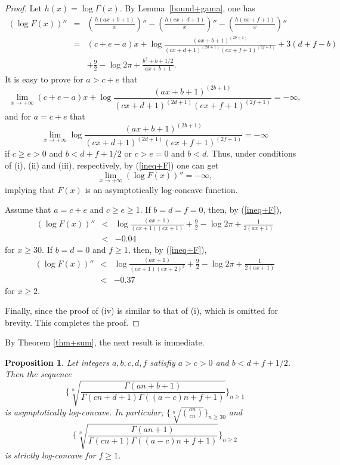 \documentclass[12pt,reqno]{article}
\newtheorem{prop}[thm]{Proposition}
\theoremstyle{definition}
\numberwithin{equation}{section}
\begin{document}
\begin{proof}
Let $h(x)=\log{\Gamma(x)}$. By Lemma~\ref{bound+gama}, one has
\begin{eqnarray}\label{ineq+F}
\left(\log
F(x)\right)''&=&\left(\frac{h(ax+b+1)}{x}\right)''-\left(\frac{h(cx+d+1)}{x}\right)''-\left(\frac{h(e x+f+1)}{x}\right)''\nonumber\\
&=&(c+e-a)x+\log\frac{(ax+b+1)^{(2b+1)}}{(cx+d+1)^{(2d+1)}(ex+f+1)^{(2f+1)}}+3(d+f-b)\nonumber\\
&&+\frac{9}{2}-\log 2\pi+\frac{b^2+b+1/2}{ax+b+1}.
\end{eqnarray}
It is easy to prove for $a> c+e$ that
$$\lim_{x\rightarrow+\infty}(c+e-a)x+\log\frac{(ax+b+1)^{(2b+1)}}{(cx+d+1)^{(2d+1)}(ex+f+1)^{(2f+1)}}=-\infty,$$
and for $a= c+e$ that
$$\lim_{x\rightarrow+\infty}\log\frac{(ax+b+1)^{(2b+1)}}{(cx+d+1)^{(2d+1)}(ex+f+1)^{(2f+1)}}=-\infty$$
if $c\ge e>0$ and $b< d+f+1/2$ or $c> e=0$ and $b< d$.
 Thus, under conditions of (i), (ii) and (iii), respectively, by (\ref{ineq+F}) one can get $$\lim_{x\rightarrow+\infty}\left(\log
F(x)\right)''=-\infty,$$ implying that $F(x)$ is an asymptotically
log-concave function.

Assume that $a=c+e$ and $c\ge e\ge 1$. If $b=d=f=0$, then, by
(\ref{ineq+F}),
\begin{eqnarray*} \left(\log F(x)\right)''
&<&\log\frac{(ax+1)}{(cx+1)(ex+1)}+\frac{9}{2}-\log 2\pi+\frac{1}{2(ax+1)}\\
&<&-0.04
\end{eqnarray*}
for $x\geq 30$.
 If $b=d=0$ and $f\geq1$, then, by
(\ref{ineq+F}),
\begin{eqnarray*} \left(\log F(x)\right)''
&<&\log\frac{(ax+1)}{(cx+1)(ex+2)^3}+\frac{9}{2}-\log 2\pi+\frac{1}{2(ax+1)}\\
&<&-0.37
\end{eqnarray*}
for $x\geq 2$.

Finally, since the proof of (iv) is similar to that of (i), which is
omitted for brevity. This completes the proof.
\end{proof}
By Theorem \ref{thm+sum}, the next result is immediate.
\begin{prop}\label{cor+bino}
Let integers $a,b,c,d,f$ satisfiy $a> c>0$ and $b< d+f+1/2$. Then
the sequence $$\{\sqrt[n]{\frac{\Gamma(an+b+1)}{\Gamma(c
n+d+1)\Gamma((a-c) n+f+1)}}\}_{n\geq1}$$ is asymptotically
log-concave. In particular, $\{\sqrt[n]{\binom{an}{cn}}\}_{n\geq30}$
and $$\{\sqrt[n]{\frac{\Gamma(an+1)}{\Gamma(c n+1)\Gamma((a-c)
n+f+1)}}\}_{n\geq2}$$ is strictly log-concave for $f\geq 1$.
\end{prop}
\end{document}
